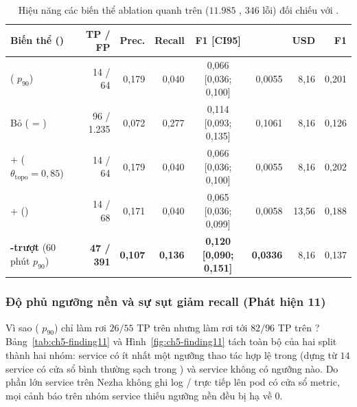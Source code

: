 \begin{table}[H]
  \centering
  \caption[Bảng ablation thành phần quanh CTAV trên test cạnh val]{Hiệu năng các biến thể ablation quanh \CTAV{} trên  ($11.985$ , $346$ lỗi) đối chiếu với .}
  \label{tab:ch5-ablation-both}
  \tblfontwide
  \tblsetup
  \setlength{\tabcolsep}{2.5pt}
  \begin{tabularx}{\linewidth}{|Y|r|r|r|c|r|r|r|}
    \hline
    \textbf{Biến thể ()} & \textbf{TP / FP} & \textbf{Prec.} & \textbf{Recall} & \textbf{F1 [CI95]} & \textbf{} & \textbf{USD} & \textbf{ F1} \\
    \hline
    \textbf{\CTAV{}} ( $p_{90}$) & 14 / 64 & 0,179 & 0,040 & 0,066 [0,036; 0,100] & 0,0055 & 8,16 & 0,201 \\
    \hline
    Bỏ  ( = ) & 96 / 1.235 & 0,072 & 0,277 & 0,114 [0,093; 0,135] & 0,1061 & 8,16 & 0,126 \\
    \hline
    +  ($\theta_{\text{topo}} = 0{,}85$) & 14 / 64 & 0,179 & 0,040 & 0,066 [0,036; 0,100] & 0,0055 & 8,16 & 0,202 \\
    \hline
    +  () & 14 / 68 & 0,171 & 0,040 & 0,065 [0,036; 0,099] & 0,0058 & 13,56 & 0,188 \\
    \hline
    \textbf{-trượt} (60 phút $p_{90}$) & \textbf{47 / 391} & \textbf{0,107} & \textbf{0,136} & \textbf{0,120 [0,090; 0,151]} & \textbf{0,0336} & 8,16 & 0,137 \\
    \hline
  \end{tabularx}
\end{table}

\subsubsection{Độ phủ ngưỡng nền  và sự sụt giảm recall (Phát hiện 11)}
\label{sec:ch5-finding11}

Vì sao  ( $p_{90}$) chỉ làm rơi $26/55$ TP trên  nhưng làm rơi tới $82/96$ TP trên ? Bảng~\ref{tab:ch5-finding11} và Hình~\ref{fig:ch5-finding11} tách toàn bộ  của hai split thành hai nhóm: service có ít nhất một ngưỡng thao tác hợp lệ trong  (dựng từ $14$ service có cửa sổ bình thường sạch trong ) và service không có ngưỡng nào. Do phần lớn service trên Nezha không ghi log / trực tiếp lên pod có cửa sổ metric, mọi cảnh báo trên nhóm service thiếu ngưỡng nền  đều bị  hạ về $0$.

